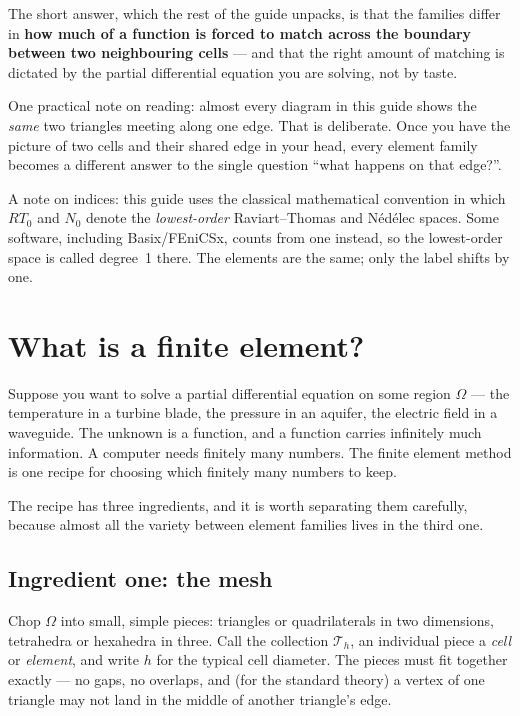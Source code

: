 \documentclass[11pt,a4paper]{article}
\newcommand{\Th}{\mathcal{T}_h}
\begin{document}
\noindent The short answer, which the rest of the guide unpacks, is that the
families differ in \textbf{how much of a function is forced to match across
the boundary between two neighbouring cells} --- and that the right amount of
matching is dictated by the partial differential equation you are solving, not
by taste.

One practical note on reading: almost every diagram in this guide shows the
\emph{same} two triangles meeting along one edge. That is deliberate. Once you
have the picture of two cells and their shared edge in your head, every element
family becomes a different answer to the single question ``what happens on that
edge?''.

\vspace{0.6em}
\noindent\textcolor{cDim}{\small A note on indices: this guide uses the classical
mathematical convention in which $RT_0$ and $N_0$ denote the \emph{lowest-order}
Raviart--Thomas and Nédélec spaces. Some software, including Basix/FEniCSx,
counts from one instead, so the lowest-order space is called degree~1 there.
The elements are the same; only the label shifts by one.}

\tableofcontents
\newpage

\section{What is a finite element?}

Suppose you want to solve a partial differential equation on some region
$\Omega$ --- the temperature in a turbine blade, the pressure in an aquifer,
the electric field in a waveguide. The unknown is a function, and a function
carries infinitely much information. A computer needs finitely many numbers.
The finite element method is one recipe for choosing which finitely many
numbers to keep.

The recipe has three ingredients, and it is worth separating them carefully,
because almost all the variety between element families lives in the third one.

\subsection{Ingredient one: the mesh}

Chop $\Omega$ into small, simple pieces: triangles or quadrilaterals in two
dimensions, tetrahedra or hexahedra in three. Call the collection $\Th$, an
individual piece a \emph{cell} or \emph{element}, and write $h$ for the typical
cell diameter. The pieces must fit together exactly --- no gaps, no overlaps,
and (for the standard theory) a vertex of one triangle may not land in the
middle of another triangle's edge.
\end{document}
